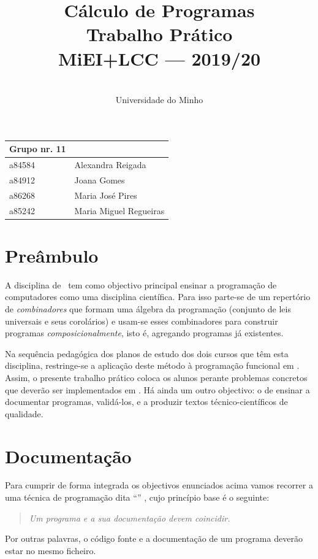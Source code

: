 \documentclass[a4paper]{article}
\title{
       	    Cálculo de Programas
\\
       	Trabalho Prático
\\
       	MiEI+LCC --- 2019/20
}
\author{
       	\dium
\\
       	Universidade do Minho
}
\date\mydate
\begin{document}
\maketitle

\begin{center}\large
\begin{tabular}{ll}
\textbf{Grupo} nr. 11 
\\\hline
a84584  & Alexandra Reigada  	
\\
a84912 & Joana Gomes 
\\
a86268 & Maria José Pires 
\\
a85242 & Maria Miguel Regueiras 
\end{tabular}
\end{center}

\section{Preâmbulo}

A disciplina de \CP\ tem como objectivo principal ensinar
a progra\-mação de computadores como uma disciplina científica. Para isso
parte-se de um repertório de \emph{combinadores} que formam uma álgebra da
programação (conjunto de leis universais e seus corolários) e usam-se esses
combinadores para construir programas \emph{composicionalmente}, isto é,
agregando programas já existentes.
  
Na sequência pedagógica dos planos de estudo dos dois cursos que têm
esta disciplina, restringe-se a aplicação deste método à programação
funcional em \Haskell. Assim, o presente trabalho prático coloca os
alunos perante problemas concretos que deverão ser implementados em
\Haskell.  Há ainda um outro objectivo: o de ensinar a documentar
programas, validá-los, e a produzir textos técnico-científicos de
qualidade.

\section{Documentação} Para cumprir de forma integrada os objectivos
enunciados acima vamos recorrer a uma técnica de programa\-ção dita
``'' \cite{Kn92}, cujo princípio base é o seguinte:
\begin{quote}\em Um programa e a sua documentação devem coincidir.
\end{quote} Por outras palavras, o código fonte e a documentação de um
programa deverão estar no mesmo ficheiro.
\end{document}
